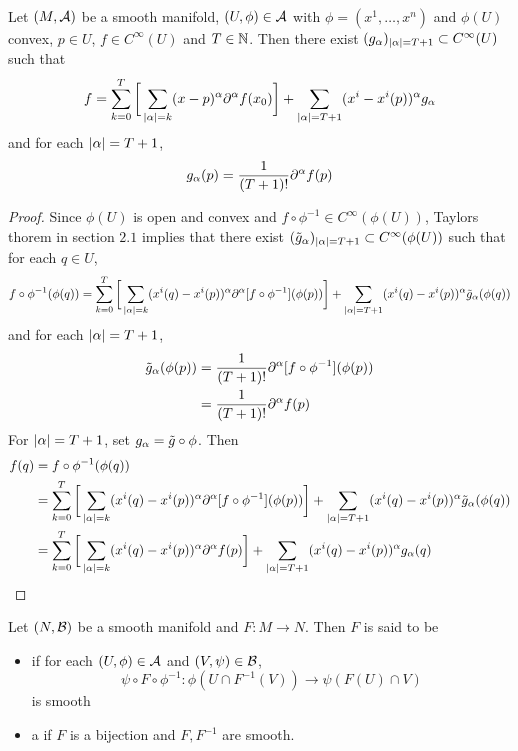 \documentclass{book}
\begin{document}
	
	\begin{ex}  \\
	Let $(M, \mathcal{A})$ be a smooth manifold, $(U, \phi) \in \mathcal{A}$ with $\phi = (x^1, \ldots, x^n)$ and $\phi(U)$ convex, $p \in U$, $f \in C^{\infty}(U)$ and $T \in \mathbb{N}$. Then there exist $(g_{\alpha})_{|\alpha| = T+1} \subset C^{\infty}(U)$ such that
		$$f = \sum_{k=0}^{T} \bigg[\sum_{|\alpha| = k}(x - p)^{\alpha} \partial^{\alpha} f (x_0) \bigg] + \sum_{|\alpha| = T+1}(x^i - x^i(p))^{\alpha} g_{\alpha}$$ and for each $|\alpha|= T+1$, $$g_{\alpha}(p) = \frac{1}{(T+1)!}\partial^{\alpha} f(p)$$
	\end{ex}
	
	\begin{proof}
	Since $\phi(U)$ is open and convex and $f \circ \phi^{-1} \in C^{\infty}(\phi(U))$, Taylors thorem in section $2.1$ implies that there exist $(\tilde{g}_{\alpha})_{|\alpha| = T+1} \subset C^{\infty}(\phi(U))$ such that for each $q \in U$, 
	$$f \circ \phi^{-1} (\phi(q)) = \sum_{k=0}^{T} \bigg[\sum_{|\alpha| = k}(x^i(q) - x^i(p))^{\alpha} \partial^{\alpha} [f \circ \phi^{-1}] (\phi(p)) \bigg] + \sum_{|\alpha| = T+1}(x^i(q) - x^i(p))^{\alpha} \tilde{g}_{\alpha}(\phi(q)) $$	
		and for each $|\alpha|= T+1$, 
		\begin{align*}
		\tilde{g}_{\alpha}(\phi(p)) 
		&= \frac{1}{(T+1)!}\partial^{\alpha} [f \circ \phi^{-1}](\phi(p)) \\
		&= \frac{1}{(T+1)!}\partial^{\alpha} f (p)
		\end{align*}
		For $|\alpha| = T+1$, set $g_{\alpha} = \tilde{g} \circ \phi$. Then 
		\begin{align*}
	f(q) 
	&= f \circ \phi^{-1} (\phi(q)) \\
	&= \sum_{k=0}^{T} \bigg[\sum_{|\alpha| = k}(x^i(q) - x^i(p))^{\alpha} \partial^{\alpha} [f \circ \phi^{-1}] (\phi(p)) \bigg] + \sum_{|\alpha| = T+1}(x^i(q) - x^i(p))^{\alpha} \tilde{g}_{\alpha}(\phi(q)) \\
	&= \sum_{k=0}^{T} \bigg[\sum_{|\alpha| = k}(x^i(q) - x^i(p))^{\alpha} \partial^{\alpha} f(p) \bigg] + \sum_{|\alpha| = T+1}(x^i(q) - x^i(p))^{\alpha} g_{\alpha}(q) \\
\end{align*}			
	\end{proof}

	\begin{defn}
		Let $(N, \mathcal{B})$ be a smooth manifold and $F: M \rightarrow N$. Then $F$ is said to be 
		\begin{itemize}
		\item {} if for each $(U, \phi) \in \mathcal{A}$ and $(V, \psi) \in \mathcal{B}$, $$\psi \circ F \circ \phi^{-1}: \phi(U \cap F^{-1}(V)) \rightarrow \psi(F(U) \cap V)$$ is smooth 
		\item a  if $F$ is a bijection and $F,F^{-1}$ are smooth.
		\end{itemize}
	\end{defn}
	
\end{document}
